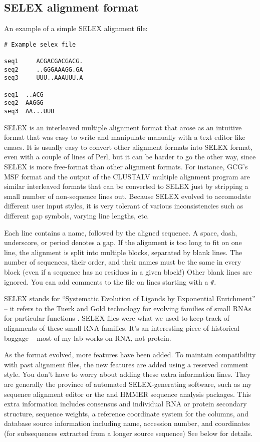\subsection{SELEX alignment format}

An example of a simple SELEX alignment file:

\begin{verbatim}
# Example selex file

seq1     ACGACGACGACG.
seq2     ..GGGAAAGG.GA
seq3     UUU..AAAUUU.A

seq1  ..ACG
seq2  AAGGG
seq3  AA...UUU
\end{verbatim}

SELEX is an interleaved multiple alignment format that arose as an
intuitive format that was easy to write and manipulate manually with a
text editor like emacs. It is usually easy to convert other alignment
formats into SELEX format, even with a couple of lines of Perl, but it
can be harder to go the other way, since SELEX is more free-format
than other alignment formats. For instance, GCG's MSF format and the
output of the CLUSTALV multiple alignment program are similar
interleaved formats that can be converted to SELEX just by stripping a
small number of non-sequence lines out. Because SELEX evolved to
accomodate different user input styles, it is very tolerant of various
inconsistencies such as different gap symbols, varying line lengths,
etc.

Each line contains a name, followed by the aligned sequence. A space,
dash, underscore, or period denotes a gap. If the alignment is too
long to fit on one line, the alignment is split into multiple blocks,
separated by blank lines. The number of sequences, their order, and
their names must be the same in every block (even if a sequence has no
residues in a given block!) Other blank lines are ignored. You can add
comments to the file on lines starting with a \verb+#+.

SELEX stands for ``Systematic Evolution of Ligands by Exponential
Enrichment'' -- it refers to the Tuerk and Gold technology for
evolving families of small RNAs for particular functions
\cite{Tuerk90b}. SELEX files were what we used to keep track of
alignments of these small RNA families. It's an interesting piece of
historical baggage -- most of my lab works on RNA, not protein.

As the format evolved, more features have been added. To maintain
compatibility with past alignment files, the new features are added
using a reserved comment style. You don't have to worry about adding
these extra information lines. They are generally the province of
automated SELEX-generating software, such as my  sequence
alignment editor or the  and HMMER sequence analysis
packages. This extra information includes consensus and individual RNA
or protein secondary structure, sequence weights, a reference
coordinate system for the columns, and database source information
including name, accession number, and coordinates (for subsequences
extracted from a longer source sequence) See below for details.

